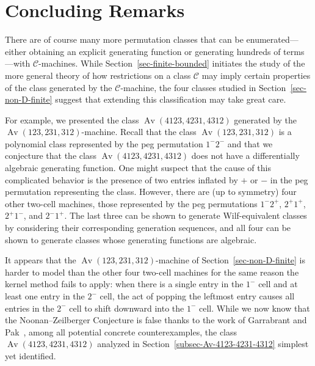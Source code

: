 \documentclass[10pt]{article}
\theoremstyle{plain}
\theoremstyle{definition}
\newcommand{\Av}{\operatorname{Av}}
\newcommand{\C}{\mathcal{C}}
\begin{document}
\section{Concluding Remarks}

There are of course many more permutation classes that can be enumerated---either obtaining an explicit generating function or generating hundreds of terms---with $\C$-machines. While Section~\ref{sec-finite-bounded} initiates the study of the more general theory of how restrictions on a class $\C$ may imply certain properties of the class generated by the $\C$-machine, the four classes studied in Section~\ref{sec-non-D-finite} suggest that extending this classification may take great care.

For example, we presented the class $\Av(4123,4231,4312)$ generated by the $\Av(123,231,312)$-machine. Recall that the class $\Av(123,231,312)$ is a polynomial class represented by the peg permutation $1^-2^-$ and that we conjecture that the class $\Av(4123,4231,4312)$ does not have a differentially algebraic generating function. One might suspect that the cause of this complicated behavior is the presence of two entries inflated by $+$ or $-$ in the peg permutation representing the class. However, there are (up to symmetry) four other two-cell machines, those represented by the peg permutations $1^-2^+$, $2^+1^+$, $2^+1^-$, and $2^-1^+$. The last three can be shown to generate Wilf-equivalent classes by considering their corresponding generation sequences, and all four can be shown to generate classes whose generating functions are algebraic.

It appears that the $\Av(123,231,312)$-machine of Section~\ref{sec-non-D-finite} is harder to model than the other four two-cell machines for the same reason the kernel method fails to apply: when there is a single entry in the $1^-$ cell and at least one entry in the $2^-$ cell, the act of popping the leftmost entry causes all entries in the $2^-$ cell to shift downward into the $1^-$ cell. While we now know that the Noonan--Zeilberger Conjecture is false thanks to the work of Garrabrant and Pak~\cite{Garrabrant:Pattern-avoidan:}, among all potential concrete counterexamples, the class $\Av(4123, 4231, 4312)$ analyzed in Section~\ref{subsec-Av-4123-4231-4312} simplest yet identified.






% 
\end{document}
